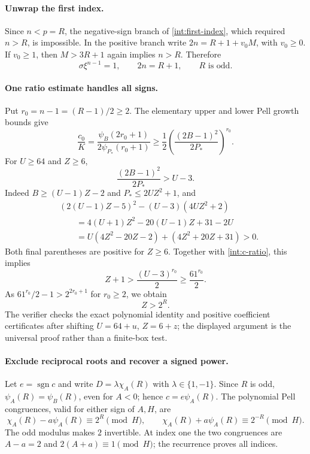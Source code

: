 \paragraph{Unwrap the first index.}
Since $n<p=R$, the negative-sign branch of \eqref{int:first-index},
which required $n>R$, is impossible.  In the positive branch write
$2n=R+1+v_0M$, with $v_0\geq0$.  If $v_0\geq1$, then
$M>3R+1$ again implies $n>R$.  Therefore
\begin{equation}\label{int:unwrap}
 \sigma\xi^{n-1}=1,\qquad 2n=R+1,\qquad R\text{ is odd}.
\end{equation}

\paragraph{One ratio estimate handles all signs.}
Put $r_0=n-1=(R-1)/2\geq2$.  The elementary upper and lower Pell
growth bounds give
\[
 \frac{c_0}{K}
 =\frac{\psi_B(2r_0+1)}{2\psi_{P_*}(r_0+1)}
 \geq\frac12\left(\frac{(2B-1)^2}{2P_*}\right)^{r_0}.
\]
For $U\geq64$ and $Z\geq6$,
\begin{equation}\label{int:uniform-ratio}
               \frac{(2B-1)^2}{2P_*}>U-3.
\end{equation}
Indeed $B\geq(U-1)Z-2$ and $P_*\leq2UZ^2+1$, and
\begin{align*}
 &(2(U-1)Z-5)^2-(U-3)(4UZ^2+2)\\
 &\qquad=4(U+1)Z^2-20(U-1)Z+31-2U\\
 &\qquad=U(4Z^2-20Z-2)+(4Z^2+20Z+31)>0.
\end{align*}
Both final parentheses are positive for $Z\geq6$.
Together with \eqref{int:c-ratio}, this implies
\[
 Z+1>\frac{(U-3)^{r_0}}2\geq\frac{61^{r_0}}2.
\]
As $61^{r_0}/2-1>2^{2r_0+1}$ for $r_0\geq2$, we obtain
\begin{equation}\label{int:large-Y}
                            Z>2^R.
\end{equation}
The verifier checks the exact polynomial identity and positive coefficient
certificates after shifting $U=64+u$, $Z=6+z$; the displayed argument is
the universal proof rather than a finite-box test.

\paragraph{Exclude reciprocal roots and recover a signed power.}
Let $e=\operatorname{sgn}c$ and write $D=\lambda\chi_A(R)$ with
$\lambda\in\{1,-1\}$.  Since $R$ is odd,
$\psi_A(R)=\psi_B(R)$, even for $A<0$; hence $c=e\psi_A(R)$.
The polynomial Pell congruences, valid for either sign of $A,H$, are
\begin{equation}\label{int:root-congruences}
 \chi_A(R)-a\psi_A(R)\equiv2^R\pmod H,\qquad
 \chi_A(R)+a\psi_A(R)\equiv2^{-R}\pmod H.
\end{equation}
The odd modulus makes $2$ invertible.  At index one the two congruences
are $A-a=2$ and $2(A+a)\equiv1\pmod H$; the recurrence proves all indices.

